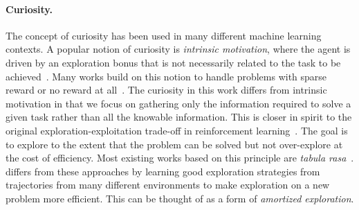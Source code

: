 \paragraph{Curiosity.} The concept of curiosity has been used in many different machine learning contexts. A popular notion of curiosity is \emph{intrinsic motivation}, where the agent is driven by an exploration bonus that is not necessarily related to the task to be achieved~\citep{schmidhuber1991curious, schmidhuber2007godel}. Many works build on this notion to handle problems with sparse reward or no reward at all~\citep{pathak2017curiosity, eysenbach2018diversity, burda2018exploration, sharma2019dynamics, pathak2019self}. The curiosity in this work differs from intrinsic motivation in that we focus on gathering only the information required to solve a given task rather than all the knowable information. This is closer in spirit to the original exploration-exploitation trade-off in reinforcement learning~\citep{sutton1998reinforcement, auer2002finite, thompson1933likelihood}. The goal is to explore to the extent that the problem can be solved but not over-explore at the cost of efficiency. Most existing works based on this principle are \emph{tabula rasa}~\citep{osband2016deep, chen2017ucb}. \ours{} differs from these approaches by learning good exploration strategies from trajectories from many different environments to make exploration on a new problem more efficient. This can be thought of as a form of \emph{amortized exploration}.
